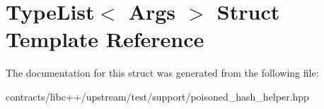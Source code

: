 \hypertarget{struct_type_list}{}\section{Type\+List$<$ Args $>$ Struct Template Reference}
\label{struct_type_list}


The documentation for this struct was generated from the following file\+:\begin{DoxyCompactItemize}
\item 
contracts/libc++/upstream/test/support/poisoned\+\_\+hash\+\_\+helper.\+hpp\end{DoxyCompactItemize}
